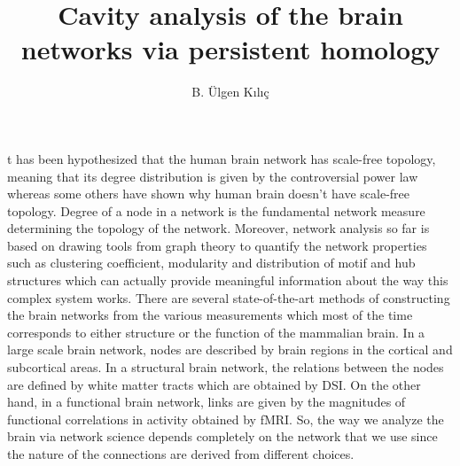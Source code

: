 \documentclass[9pt,twocolumn,twoside,lineno]{pnas-new}
\title{Cavity analysis of the brain networks via persistent homology}
\author[a,1]{B. Ülgen Kılıç}
\affil[a]{University at Buffalo, Department of Mathematics}
\begin{document}
\maketitle
\thispagestyle{firststyle}

t has been hypothesized that the human brain network has scale-free topology, meaning that its degree distribution is given by the controversial power law\cite{smallworld1,smallworld2} whereas some others have shown why human brain doesn't have scale-free topology\cite{smallworld3}. Degree of a node in a network is the fundamental network measure determining the topology of the network. Moreover, network analysis so far is based on drawing tools from graph theory to quantify the network properties such as clustering coefficient, modularity and distribution of motif and hub structures which can actually provide meaningful information about the way this complex system works\cite{graphtheory,netwmeasure}. There are several state-of-the-art methods of constructing the brain networks from the various measurements \cite{stateoftheart} which most of the time corresponds to either structure or the function of the mammalian  brain.  In a large scale brain network, nodes are described by brain regions in the cortical and subcortical areas. In a structural brain network, the relations between the nodes are defined by white matter tracts which are obtained by DSI. On the other hand, in a functional brain network, links are given by the magnitudes of functional correlations in activity obtained by fMRI. So, the way we analyze the brain via network science depends completely on the network that we use since the nature of the connections are derived from different choices.
\end{document}

